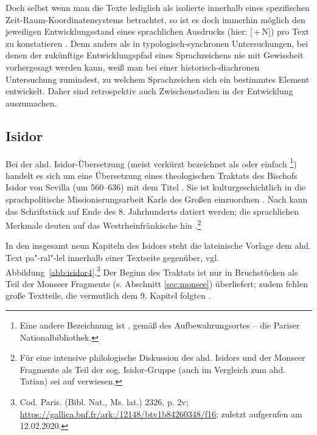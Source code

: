 Doch selbst wenn man die Texte lediglich als isolierte  innerhalb eines spezifischen Zeit-Raum-Koordinatensystems \parencite[157]{Leiss2000} betrachtet, so ist es doch immerhin möglich den jeweiligen Entwicklungsstand eines sprachlichen Ausdrucks (hier: [\,+\,N]) pro Text
zu konstatieren \parencite[vgl. zu diesem Vorgehen auch][29]{Himmelmann1997}. Denn anders als in typologisch-synchronen Untersuchungen, bei denen der zukünftige Entwicklungspfad eines Sprachzeichens nie mit Gewissheit vorhergesagt werden kann, weiß man bei einer historisch-diachronen Untersuchung zumindest, zu welchem  Sprachzeichen sich ein bestimmtes Element entwickelt. Daher sind retrospektiv auch Zwischenstadien in der Entwicklung auszumachen.      


\subsection{Isidor} \label{sec:isidor}

Bei der  ahd. Isidor-Übersetzung (meist verkürzt bezeichnet als  oder einfach \footnote{Eine andere Bezeichnung ist , gemäß des Aufbewahrungsortes -- die Pariser Nationalbibliothek.}) handelt es sich um eine Übersetzung eines theologischen Traktats des Bischofs Isidor von Sevilla (um 560--636) mit dem Titel . Sie ist kulturgeschichtlich in die sprachpolitische Missionierungsarbeit Karls des Großen einzuordnen \parencite[vgl.][36--38]{Schlachter2012}. Nach \textcite[VIII][]{Eggers1964} kann das Schriftstück auf Ende des 8. Jahrhunderts datiert werden; die sprachlichen Merkmale deuten auf das Westrheinfränkische hin \parencite{Matzel1970}.\footnote{Für eine intensive philologische Diskussion des ahd. Isidors und der Monseer Fragmente als Teil der sog. Isidor-Gruppe (auch im Vergleich zum ahd. Tatian) sei auf \textcite[17--53]{Schlachter2012} verwiesen.} 

In den insgesamt neun Kapiteln des Isidors steht die lateinische Vorlage dem ahd. Text pa"-ral"-lel innerhalb einer Textseite gegenüber, vgl. Abbildung~\ref{abb:isidor4}.\footnote{Cod. Paris. (Bibl. Nat., Ms. lat.) 2326, p. 2v; 
\url{https://gallica.bnf.fr/ark:/12148/btv1b84260348/f16}; zuletzt aufgerufen am 12.02.2020.} Der Beginn des Traktats ist nur in Bruchstücken als Teil der Monseer Fragmente (s. Abschnitt \ref{sec:monsee}) überliefert; zudem fehlen große Textteile, die vermutlich dem 9. Kapitel folgten \parencite[25]{Schlachter2012}.

